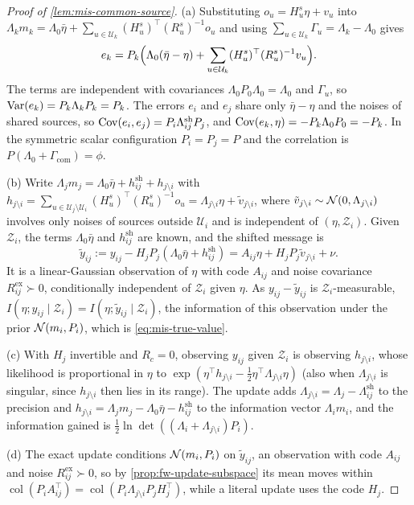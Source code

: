\begin{proof}[Proof of \cref{lem:mis-common-source}]
(a) Substituting $o_u=H^s_u\eta+v_u$ into $\Lambda_km_k=\Lambda_0\bar\eta+\sum_{u\in\mathcal U_k}(H^s_u)^\top(R^s_u)^{-1}o_u$ and using $\sum_{u\in\mathcal U_k}\Gamma_u=\Lambda_k-\Lambda_0$ gives
\begin{equation*}
e_k=P_k\Bigl(\Lambda_0(\bar\eta-\eta)+\sum_{u\in\mathcal U_k}(H^s_u)^\top(R^s_u)^{-1}v_u\Bigr).
\end{equation*}
The terms are independent with covariances $\Lambda_0P_0\Lambda_0=\Lambda_0$ and $\Gamma_u$, so $\operatorname{Var}(e_k)=P_k\Lambda_kP_k=P_k$. The errors $e_i$ and $e_j$ share only $\bar\eta-\eta$ and the noises of shared sources, so $\operatorname{Cov}(e_i,e_j)=P_i\Lambda^{\mathrm{sh}}_{ij}P_j$, and $\operatorname{Cov}(e_k,\eta)=-P_k\Lambda_0P_0=-P_k$. In the symmetric scalar configuration $P_i=P_j=P$ and the correlation is $P(\Lambda_0+\Gamma_{\mathrm{com}})=\phi$.

(b) Write $\Lambda_jm_j=\Lambda_0\bar\eta+h^{\mathrm{sh}}_{ij}+h_{j\setminus i}$ with $h_{j\setminus i}=\sum_{u\in\mathcal U_j\setminus\mathcal U_i}(H^s_u)^\top(R^s_u)^{-1}o_u=\Lambda_{j\setminus i}\eta+\tilde v_{j\setminus i}$, where $\tilde v_{j\setminus i}\sim\mathcal{N}(0,\Lambda_{j\setminus i})$ involves only noises of sources outside $\mathcal U_i$ and is independent of $(\eta,\mathcal Z_i)$. Given $\mathcal Z_i$, the terms $\Lambda_0\bar\eta$ and $h^{\mathrm{sh}}_{ij}$ are known, and the shifted message is
\begin{equation*}
\tilde y_{ij}:=y_{ij}-H_jP_j(\Lambda_0\bar\eta+h^{\mathrm{sh}}_{ij})=A_{ij}\eta+H_jP_j\tilde v_{j\setminus i}+\nu .
\end{equation*}
It is a linear-Gaussian observation of $\eta$ with code $A_{ij}$ and noise covariance $R^{\mathrm{ex}}_{ij}\succ0$, conditionally independent of $\mathcal Z_i$ given $\eta$. As $y_{ij}-\tilde y_{ij}$ is $\mathcal Z_i$-measurable, $I(\eta;y_{ij}\mid\mathcal Z_i)=I(\eta;\tilde y_{ij}\mid\mathcal Z_i)$, the information of this observation under the prior $\mathcal{N}(m_i,P_i)$, which is \eqref{eq:mis-true-value}.

(c) With $H_j$ invertible and $R_c=0$, observing $y_{ij}$ given $\mathcal Z_i$ is observing $h_{j\setminus i}$, whose likelihood is proportional in $\eta$ to $\exp(\eta^\top h_{j\setminus i}-\tfrac12\eta^\top\Lambda_{j\setminus i}\eta)$ (also when $\Lambda_{j\setminus i}$ is singular, since $h_{j\setminus i}$ then lies in its range). The update adds $\Lambda_{j\setminus i}=\Lambda_j-\Lambda^{\mathrm{sh}}_{ij}$ to the precision and $h_{j\setminus i}=\Lambda_jm_j-\Lambda_0\bar\eta-h^{\mathrm{sh}}_{ij}$ to the information vector $\Lambda_im_i$, and the information gained is $\tfrac12\ln\det((\Lambda_i+\Lambda_{j\setminus i})P_i)$.

(d) The exact update conditions $\mathcal{N}(m_i,P_i)$ on $\tilde y_{ij}$, an observation with code $A_{ij}$ and noise $R^{\mathrm{ex}}_{ij}\succ0$, so by \cref{prop:fw-update-subspace} its mean moves within $\operatorname{col}(P_iA_{ij}^\top)=\operatorname{col}(P_i\Lambda_{j\setminus i}P_jH_j^\top)$, while a literal update uses the code $H_j$.
\end{proof}

